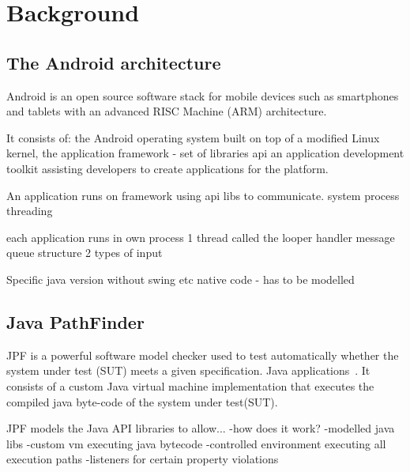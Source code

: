 \documentclass{acm_proc_article-sp}
\begin{document}
\section{Background}
\subsection{The Android architecture}
Android is an open source software stack for mobile devices such as smartphones and tablets with an advanced RISC Machine (ARM)
architecture.

It consists of:
    the Android operating system built on top of a modified Linux kernel,
    the application framework - set of libraries api
    an application development toolkit assisting developers to create applications for the platform.

    
An application runs on framework using api libs to communicate.
system process threading


each application runs in own process
1 thread called the looper
handler message queue structure
2 types of input



Specific java version without swing etc
native code - has to be modelled


\subsection{Java PathFinder}
JPF is a powerful software model checker used to test automatically whether the system under test (SUT) meets a given specification.
Java applications~\cite{}. It consists of a custom Java virtual machine implementation that executes the compiled java byte-code of the
system under test(SUT).


JPF models the Java API libraries to allow... 
-how does it work?
-modelled java libs
-custom vm executing java bytecode
-controlled environment executing all execution paths
-listeners for certain property violations 
\end{document}
